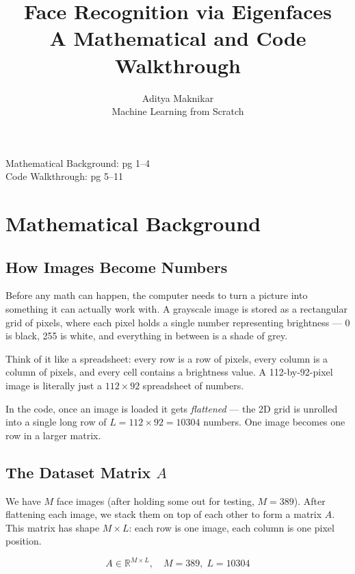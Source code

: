 \documentclass[12pt,a4paper]{article}
\title{
  \textbf{Face Recognition via Eigenfaces} \\[0.4em]
  \large A Mathematical and Code Walkthrough
}
\author{Aditya Maknikar \\ Machine Learning from Scratch}
\date{}
\begin{document}
\maketitle

\begin{center}
Mathematical Background: pg 1--4\\
Code Walkthrough: pg 5--11
\end{center}

\section{Mathematical Background}

\subsection{How Images Become Numbers}

Before any math can happen, the computer needs to turn a picture into something
it can actually work with. A grayscale image is stored as a rectangular grid of
pixels, where each pixel holds a single number representing brightness --- 0 is
black, 255 is white, and everything in between is a shade of grey.

Think of it like a spreadsheet: every row is a row of pixels, every column is a
column of pixels, and every cell contains a brightness value. A 112-by-92-pixel
image is literally just a $112 \times 92$ spreadsheet of numbers.

In the code, once an image is loaded it gets \emph{flattened} --- the 2D grid is
unrolled into a single long row of $L = 112 \times 92 = 10304$ numbers. One
image becomes one row in a larger matrix.

\subsection{The Dataset Matrix \texorpdfstring{$A$}{A}}

We have $M$ face images (after holding some out for testing, $M = 389$). After
flattening each image, we stack them on top of each other to form a matrix
$A$. This matrix has shape $M \times L$: each row is one image, each column
is one pixel position.

\[
A \in \mathbb{R}^{M \times L}, \quad M = 389,\; L = 10304
\]
\end{document}

